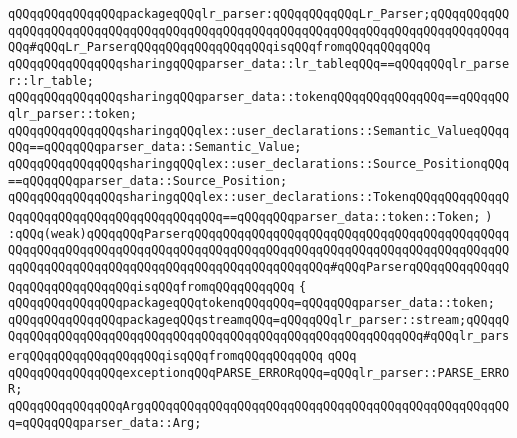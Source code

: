 \verb|qQQqqQQqqQQqqQQqpackageqQQqlr_parser:qQQqqQQqqQQqLr_Parser;qQQqqQQqqQQqqQQqqQQqqQQqqQQqqQQqqQQqqQQqqQQqqQQqqQQqqQQqqQQqqQQqqQQqqQQqqQQqqQQqqQQq#qQQqLr_ParserqQQqqQQqqQQqqQQqqQQqisqQQqfromqQQqqQQqqQQq|\newline
\newline
\verb|qQQqqQQqqQQqqQQqsharingqQQqparser_data::lr_tableqQQq==qQQqqQQqlr_parser::lr_table;|\newline
\verb|qQQqqQQqqQQqqQQqsharingqQQqparser_data::tokenqQQqqQQqqQQqqQQq==qQQqqQQqlr_parser::token;|\newline
\newline
\verb|qQQqqQQqqQQqqQQqsharingqQQqlex::user_declarations::Semantic_ValueqQQqqQQq==qQQqqQQqparser_data::Semantic_Value;|\newline
\verb|qQQqqQQqqQQqqQQqsharingqQQqlex::user_declarations::Source_PositionqQQq==qQQqqQQqparser_data::Source_Position;|\newline
\verb|qQQqqQQqqQQqqQQqsharingqQQqlex::user_declarations::TokenqQQqqQQqqQQqqQQqqQQqqQQqqQQqqQQqqQQqqQQqqQQq==qQQqqQQqparser_data::token::Token;|\newline
\verb|)|\newline
\newline
\verb|:qQQq(weak)qQQqqQQqParserqQQqqQQqqQQqqQQqqQQqqQQqqQQqqQQqqQQqqQQqqQQqqQQqqQQqqQQqqQQqqQQqqQQqqQQqqQQqqQQqqQQqqQQqqQQqqQQqqQQqqQQqqQQqqQQqqQQqqQQqqQQqqQQqqQQqqQQqqQQqqQQqqQQqqQQqqQQqqQQq#qQQqParserqQQqqQQqqQQqqQQqqQQqqQQqqQQqqQQqisqQQqfromqQQqqQQqqQQq|\newline
\newline
\verb|{|\newline
\verb|qQQqqQQqqQQqqQQqpackageqQQqtokenqQQqqQQq=qQQqqQQqparser_data::token;|\newline
\verb|qQQqqQQqqQQqqQQqpackageqQQqstreamqQQq=qQQqqQQqlr_parser::stream;qQQqqQQqqQQqqQQqqQQqqQQqqQQqqQQqqQQqqQQqqQQqqQQqqQQqqQQqqQQqqQQq#qQQqlr_parserqQQqqQQqqQQqqQQqqQQqisqQQqfromqQQqqQQqqQQq|\newline
\verb|qQQq|\newline
\verb|qQQqqQQqqQQqqQQqexceptionqQQqPARSE_ERRORqQQq=qQQqlr_parser::PARSE_ERROR;|\newline
\newline
\verb|qQQqqQQqqQQqqQQqArgqQQqqQQqqQQqqQQqqQQqqQQqqQQqqQQqqQQqqQQqqQQqqQQqqQQq=qQQqqQQqparser_data::Arg;|\newline
